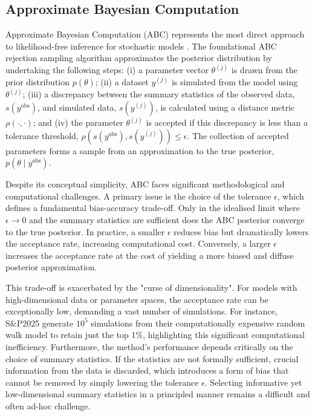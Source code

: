 \documentclass{article}
\begin{document}
\subsection{Approximate Bayesian Computation}

Approximate Bayesian Computation (ABC)  represents the most direct approach to likelihood-free inference for stochastic models  \citep{SunnkerABC,Sisson2018}. The foundational ABC rejection sampling algorithm approximates the posterior distribution by undertaking the following steps: (i) a parameter vector $\theta^{(j)}$ is drawn from the prior distribution $p(\theta)$; (ii) a dataset $y^{(j)}$ is simulated from the model using $\theta^{(j)}$; (iii) a discrepancy between the summary statistics of the observed data, $s(y^{\text{obs}})$, and simulated data, $s(y^{(j)})$, is calculated using a distance metric $\rho(\cdot, \cdot)$; and (iv) the parameter $\theta^{(j)}$ is accepted if this discrepancy is less than a tolerance threshold, $\rho(s(y^{\text{obs}}), s(y^{(j)})) \le \epsilon$. The collection of accepted parameters forms a sample from an approximation to the true posterior, $p(\theta \mid y^{\text{obs}})$.


Despite its conceptual simplicity, ABC faces significant methodological and computational challenges. A primary issue is the choice of the tolerance $\epsilon$, which defines a fundamental bias-accuracy trade-off. Only in the idealised limit where $\epsilon \to 0$ and the summary statistics are sufficient does the ABC posterior converge to the true posterior. In practice, a smaller $\epsilon$ reduces bias but dramatically lowers the acceptance rate, increasing computational cost. Conversely, a larger $\epsilon$ increases the acceptance rate at the cost of yielding a more biased and diffuse posterior approximation. 

This trade-off is exacerbated by the "curse of dimensionality". For models with high-dimensional data or parameter spaces, the acceptance rate can be exceptionally low, demanding a vast number of simulations. For instance, S\&P2025 generate $10^5$ simulations from their computationally expensive random walk model to retain just the top 1\%, highlighting this significant computational inefficiency. Furthermore, the method's performance depends critically on the choice of summary statistics. If the statistics are not formally sufficient, crucial information from the data is discarded, which introduces a form of bias that cannot be removed by simply lowering the tolerance $\epsilon$. Selecting informative yet low-dimensional summary statistics in a principled manner remains a difficult and often ad-hoc challenge.
\end{document}
